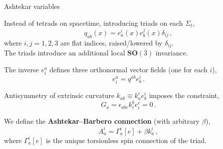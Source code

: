 \documentclass[12pt,titlepage]{article}
\begin{document}
\begin{frame}{Ashtekar variables}
    \begin{list}{\,}{\leftmargin=1em \itemindent=0em}
        \item<1-> Instead of tetrads on spacetime, introducing triads on each $\Sigma_t$,
        \begin{equation}
            q_{ab}(x)=e_a^i(x)e_b^j(x)\delta_{ij}\,,
        \end{equation}
        where $i,j=1,2,3$ are flat indices, raised/lowered by $\delta_{ij}$.\\
        The triads introduce an additional local $\mathbf{SO}(3)$ invariance.
        \item<2-> The inverse $e^a_i$ defines three orthonormal vector fields (one for each $i$),
        \begin{equation}
            e^a_i=q^{ab}e_b^i\,.
        \end{equation}
        \item<3-> Antisymmetry of extrinsic curvature $k_{ab}\equiv k_a^i e_b^i$ imposes the constraint,
        \begin{equation}
            G_a=\epsilon_{abc}k^b_i e^c_i=0\,.
        \end{equation}
        \item<4-> We define the \textbf{Ashtekar–Barbero connection} (with arbitrary $\beta$),
        \begin{equation}
            A_a^i=\Gamma_a^i[e]+\beta k_a^i\,,
        \end{equation}
        where $\Gamma_a^i[e]$ is the unique torsionless spin connection of the triad.
    \end{list}
\end{frame}
\end{document}
